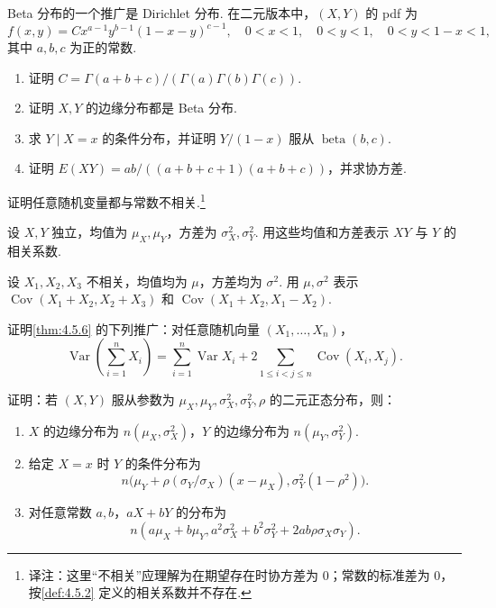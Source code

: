 \begin{exercise}\label{exercise:4.40}
Beta 分布的一个推广是 Dirichlet 分布. 在二元版本中，$(X,Y)$ 的 pdf 为
$$f(x,y)=Cx^{a-1}y^{b-1}(1-x-y)^{c-1},\quad0<x<1,\quad0<y<1,\quad0<y<1-x<1,$$
其中 $a,b,c$ 为正的常数.

\begin{enumerate}
\item[(a)] 证明 $C=\Gamma(a+b+c)/(\Gamma(a)\Gamma(b)\Gamma(c))$.
\item[(b)] 证明 $X,Y$ 的边缘分布都是 Beta 分布.
\item[(c)] 求 $Y\mid X=x$ 的条件分布，并证明 $Y/(1-x)$ 服从 $\operatorname{beta}(b,c)$.
\item[(d)] 证明 $E(XY)=ab/((a+b+c+1)(a+b+c))$，并求协方差.
\end{enumerate}
\end{exercise}
\begin{exercise}\label{exercise:4.41}
证明任意随机变量都与常数不相关.\footnote{译注：这里“不相关”应理解为在期望存在时协方差为 0；常数的标准差为 0，按\autoref{def:4.5.2} 定义的相关系数并不存在.}
\end{exercise}
\begin{exercise}\label{exercise:4.42}
设 $X,Y$ 独立，均值为 $\mu_X,\mu_Y$，方差为 $\sigma_X^2,\sigma_Y^2$. 用这些均值和方差表示 $XY$ 与 $Y$ 的相关系数.
\end{exercise}
\begin{exercise}\label{exercise:4.43}
设 $X_1,X_2,X_3$ 不相关，均值均为 $\mu$，方差均为 $\sigma^2$. 用 $\mu,\sigma^2$ 表示 $\operatorname{Cov}(X_1+X_2,X_2+X_3)$ 和 $\operatorname{Cov}(X_1+X_2,X_1-X_2)$.
\end{exercise}
\begin{exercise}\label{exercise:4.44}
证明\autoref{thm:4.5.6} 的下列推广：对任意随机向量 $(X_1,\ldots,X_n)$，
$$\operatorname{Var}\left(\sum_{i=1}^nX_i\right)=\sum_{i=1}^n\operatorname{Var}X_i+2\sum_{1\le i<j\le n}\operatorname{Cov}(X_i,X_j).$$
\end{exercise}
\begin{exercise}\label{exercise:4.45}
证明：若 $(X,Y)$ 服从参数为 $\mu_X,\mu_Y,\sigma_X^2,\sigma_Y^2,\rho$ 的二元正态分布，则：
\begin{enumerate}
\item[(a)] $X$ 的边缘分布为 $n(\mu_X,\sigma_X^2)$，$Y$ 的边缘分布为 $n(\mu_Y,\sigma_Y^2)$.
\item[(b)] 给定 $X=x$ 时 $Y$ 的条件分布为
$$n\bigl(\mu_Y+\rho(\sigma_Y/\sigma_X)(x-\mu_X),\sigma_Y^2(1-\rho^2)\bigr).$$
\item[(c)] 对任意常数 $a,b$，$aX+bY$ 的分布为
$$n(a\mu_X+b\mu_Y,a^2\sigma_X^2+b^2\sigma_Y^2+2ab\rho\sigma_X\sigma_Y).$$
\end{enumerate}
\end{exercise}
